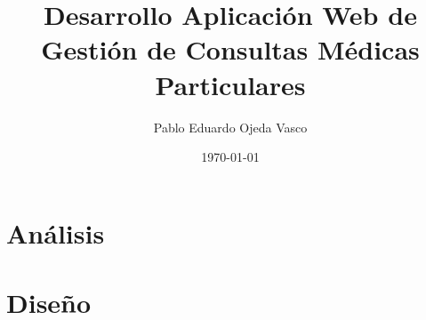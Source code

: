 \documentclass[a4paper,oneside,11pt]{book}
\title{\bf Desarrollo Aplicación Web de Gestión de Consultas Médicas Particulares}
\author{Pablo Eduardo Ojeda Vasco}
\date{\today}
\begin{document}
	\maketitle
	
	\newpage 
	\thispagestyle{empty} 
	
	
	
	\frontmatter

	\tableofcontents
	\listoffigures
	\listoftables
	
	\mainmatter
	
	
	\chapter{Análisis} %
	\label{cha:analisis}
	
	\chapter{Diseño} %
	\label{cha:diseno}
	
	
	

\end{document}
